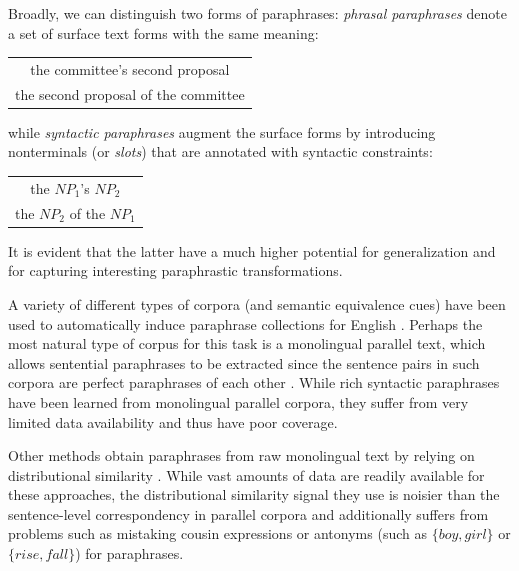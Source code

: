 \documentclass[11pt]{article}
\begin{document}
Broadly, we can distinguish two forms of paraphrases: \emph{phrasal
  paraphrases} denote a set of surface text forms with the same
meaning:
\begin{center}
\begin{tabular}{c}
the committee's second proposal \\
the second proposal of the committee
\end{tabular}
\end{center}
while \emph{syntactic paraphrases} augment the surface forms by
introducing nonterminals (or \emph{slots}) that are annotated with
syntactic constraints:
\begin{center}
\begin{tabular}{c}
the $\mathit{NP}_1$'s $\mathit{NP}_2$ \\
the $\mathit{NP}_2$ of the $\mathit{NP}_1$
\end{tabular}
\end{center}
It is evident that the latter have a much higher potential for
generalization and for capturing interesting paraphrastic transformations.

A variety of different types of corpora (and semantic equivalence
cues) have been used to automatically induce paraphrase collections
for English \cite{Madnani2010}. Perhaps the most natural type of
corpus for this task is a monolingual parallel text, which allows
sentential paraphrases to be extracted since the
sentence pairs in such corpora are perfect paraphrases of each other
\cite{Barzilay2001,Pang2003}. While rich syntactic paraphrases have
been learned from monolingual parallel corpora, they suffer from very limited data
availability and thus have poor coverage.

Other methods obtain paraphrases from raw monolingual text by relying
on distributional similarity \cite{Lin2001,Bhagat2008}. While vast
amounts of data are readily available for these approaches, the
distributional similarity signal they use is noisier than the
sentence-level correspondency in parallel corpora and additionally
suffers from problems such as mistaking cousin expressions or antonyms
(such as $\{\mathit{boy}, \mathit{girl}\}$ or $\{\mathit{rise},
\mathit{fall}\}$) for paraphrases.
\end{document}
